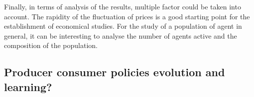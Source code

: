 \documentclass[a4paper]{article}
\begin{document}
Finally, in terms of analysis of the results, multiple factor could be taken into account. The rapidity of the fluctuation of prices is a good starting point for the establishment of economical studies. For the study of a population of agent in general, it can be interesting to analyse the number of agents active and the composition of the population.

\subsection{ Producer consumer policies evolution and learning?}

\cite{pao}
  

\end{document}

